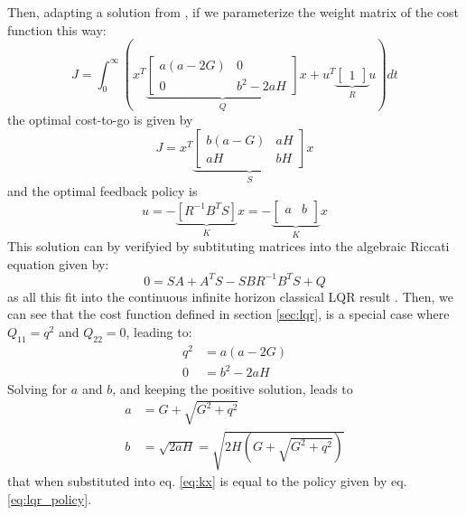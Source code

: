 Then, adapting a solution from \cite{hanks_closed-form_1991}, if we parameterize the weight matrix of the cost function this way:
\begin{equation}
J = \int_0^{\infty}{ \left( x^T 
\underbrace{
\begin{bmatrix}
    a(a-2G) & 0 \\
    0       & b^2 - 2 a H
\end{bmatrix}
}_{Q} x
+
u^T 
\underbrace{
\begin{bmatrix}
    1 
\end{bmatrix}
}_{R} u
\right) dt } 
\end{equation}
the optimal cost-to-go is given by
\begin{equation}
J =   x^T 
\underbrace{
\begin{bmatrix}
    b(a-G) & aH \\
    aH       & bH
\end{bmatrix}
}_{S} x
\end{equation}
and the optimal feedback policy is 
\begin{equation}
u = 
- \underbrace{\left[ R^{-1} B^T S\right]}_{K} x
=
-
\underbrace{
\begin{bmatrix}
    a & b \\
\end{bmatrix}
}_{K} x
\label{eq:kx}
\end{equation}
This solution can by verifyied by subtituting matrices into the algebraic Riccati equation given by:
\begin{equation}
0 = SA + A^T S - SBR^{-1}B^TS + Q
\end{equation}
as all this fit into the continuous infinite horizon classical LQR result \cite{bertsekas_dynamic_2012}. 
Then, we can see that the cost function defined in section \ref{sec:lqr}, is a special case where $Q_{11} = q^2$ and $Q_{22}=0$, leading to:
\begin{align}
q^2 &= a(a-2G) \\
0   &= b^2 -2aH
\end{align}
Solving for $a$ and $b$, and keeping the positive solution, leads to
\begin{align}
a &= G + \sqrt{G^2+q^2} \\
b &= \sqrt{2aH} = \sqrt{2H(G + \sqrt{G^2+q^2})}
\end{align}
that when substituted into eq. \eqref{eq:kx} is equal to the policy given by eq. \eqref{eq:lqr_policy}.




